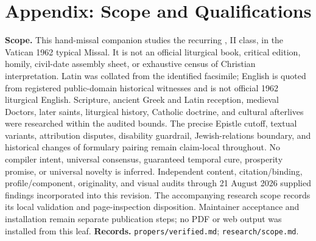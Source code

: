 \section*{Appendix: Scope and Qualifications}

\begin{studyframe}
\textbf{Scope.} This hand-missal companion studies the recurring
, II class, in the Vatican 1962
typical Missal. It is not an official liturgical book, critical edition,
homily, civil-date assembly sheet, or exhaustive census of Christian
interpretation. Latin was collated from the identified facsimile; English is
quoted from registered public-domain historical witnesses and is not official
1962 liturgical English. Scripture, ancient Greek and Latin reception,
medieval Doctors, later saints, liturgical history, Catholic doctrine, and
cultural afterlives were researched within the audited bounds. The precise
Epistle cutoff, textual variants, attribution disputes, disability guardrail,
Jewish-relations boundary, and historical changes of formulary pairing remain
claim-local throughout. No compiler intent, universal consensus, guaranteed
temporal cure, prosperity promise, or universal novelty is inferred.
Independent content, citation/binding, profile/component, originality, and
visual audits through 21 August 2026 supplied findings incorporated into this
revision. The accompanying research scope records its local validation and
page-inspection disposition. Maintainer acceptance and installation remain
separate publication steps; no PDF or web output was installed from this leaf.
\textbf{Records.} \nolinkurl{propers/verified.md};
\nolinkurl{research/scope.md}.
\end{studyframe}
